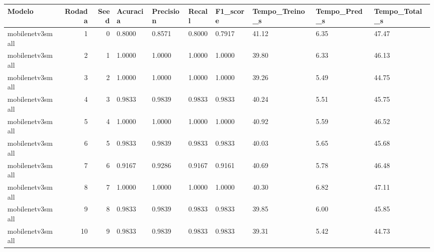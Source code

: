 \begin{tabular}{lrrlllllll}
\toprule
Modelo & Rodada & Seed & Acuracia & Precision & Recall & F1_score & Tempo_Treino_s & Tempo_Pred_s & Tempo_Total_s \\
\midrule
mobilenetv3small & 1 & 0 & 0.8000 & 0.8571 & 0.8000 & 0.7917 & 41.12 & 6.35 & 47.47 \\
mobilenetv3small & 2 & 1 & 1.0000 & 1.0000 & 1.0000 & 1.0000 & 39.80 & 6.33 & 46.13 \\
mobilenetv3small & 3 & 2 & 1.0000 & 1.0000 & 1.0000 & 1.0000 & 39.26 & 5.49 & 44.75 \\
mobilenetv3small & 4 & 3 & 0.9833 & 0.9839 & 0.9833 & 0.9833 & 40.24 & 5.51 & 45.75 \\
mobilenetv3small & 5 & 4 & 1.0000 & 1.0000 & 1.0000 & 1.0000 & 40.92 & 5.59 & 46.52 \\
mobilenetv3small & 6 & 5 & 0.9833 & 0.9839 & 0.9833 & 0.9833 & 40.03 & 5.65 & 45.68 \\
mobilenetv3small & 7 & 6 & 0.9167 & 0.9286 & 0.9167 & 0.9161 & 40.69 & 5.78 & 46.48 \\
mobilenetv3small & 8 & 7 & 1.0000 & 1.0000 & 1.0000 & 1.0000 & 40.30 & 6.82 & 47.11 \\
mobilenetv3small & 9 & 8 & 0.9833 & 0.9839 & 0.9833 & 0.9833 & 39.85 & 6.00 & 45.85 \\
mobilenetv3small & 10 & 9 & 0.9833 & 0.9839 & 0.9833 & 0.9833 & 39.31 & 5.42 & 44.73 \\
\bottomrule
\end{tabular}
